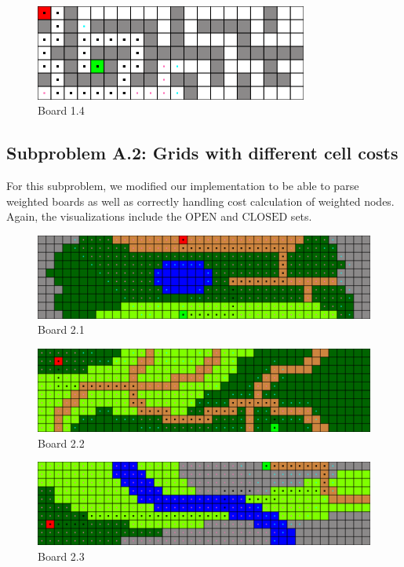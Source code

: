 \begin{figure}[h!]
  \centering
    \includegraphics[width=0.8\textwidth]{img/board-1-4-astar}
    \caption{Board 1.4}
\end{figure}

\clearpage

\subsection*{Subproblem A.2: Grids with different cell costs}

For this subproblem, we modified our implementation to be able to parse weighted
boards as well as correctly handling cost calculation of weighted nodes.
Again, the visualizations include the $\text{OPEN}$ and $\text{CLOSED}$ sets.

\begin{figure}[h!]
  \centering
    \includegraphics[width=\textwidth]{img/board-2-1-astar}
    \caption{Board 2.1}
\end{figure}

\begin{figure}[h!]
  \centering
    \includegraphics[width=\textwidth]{img/board-2-2-astar}
    \caption{Board 2.2}
\end{figure}

\begin{figure}[h!]
  \centering
    \includegraphics[width=\textwidth]{img/board-2-3-astar}
    \caption{Board 2.3}
\end{figure}

